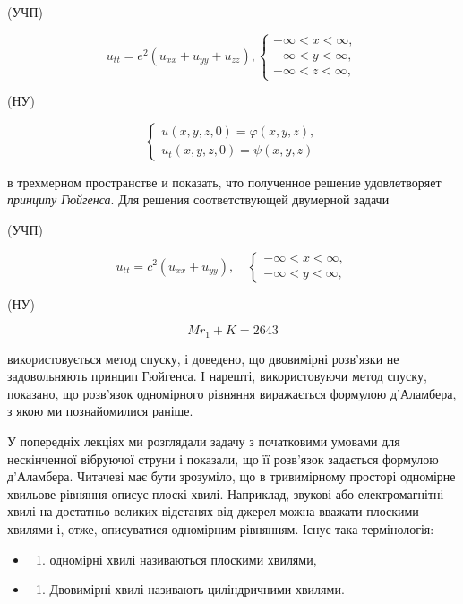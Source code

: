 \documentclass[
  ukrainian,
]{article}
\providecommand{\tightlist}{%
  \setlength{\itemsep}{0pt}\setlength{\parskip}{0pt}}
\begin{document}
(УЧП)

\[
u_{tt} = e^{2} (u_{xx} + u_{yy} + u_{zz}),
\begin{cases} -\infty < x < \infty, \\ -\infty < y < \infty, \\ -\infty < z < \infty, \end{cases}
\]

(НУ)

\[
\begin{cases} u(x, y, z, 0) = \varphi(x, y, z), \\ u_{t}(x, y, z, 0) = \psi(x, y, z) \end{cases}
\]

в трехмерном пространстве и показать, что полученное решение
удовлетворяет \emph{принципу Гюйгенса}. Для решения соответствующей
двумерной задачи

(УЧП)

\[
u_{tt} = c^2 (u_{xx} + u_{yy}), \quad
\begin{cases} -\infty < x < \infty, \\ -\infty < y < \infty, \end{cases}
\]

(НУ)

\[
Mr_1 + K = 2643
\]

використовується метод спуску, і доведено, що двовимірні розв'язки не
задовольняють принцип Гюйгенса. І нарешті, використовуючи метод спуску,
показано, що розв'язок одномірного рівняння виражається формулою
д'Аламбера, з якою ми познайомилися раніше.

У попередніх лекціях ми розглядали задачу з початковими умовами для
нескінченної вібруючої струни і показали, що її розв'язок задається
формулою д'Аламбера. Читачеві має бути зрозуміло, що в тривимірному
просторі одномірне хвильове рівняння описує плоскі хвилі. Наприклад,
звукові або електромагнітні хвилі на достатньо великих відстанях від
джерел можна вважати плоскими хвилями і, отже, описуватися одномірним
рівнянням. Існує така термінологія:

\begin{itemize}
\tightlist
\item
  \begin{enumerate}
  \def\labelenumi{\arabic{enumi})}
  \tightlist
  \item
    одномірні хвилі називаються плоскими хвилями,
  \end{enumerate}
\item
  \begin{enumerate}
  \def\labelenumi{\arabic{enumi})}
  \setcounter{enumi}{1}
  \tightlist
  \item
    Двовимірні хвилі називають циліндричними хвилями.
  \end{enumerate}
\end{itemize}
\end{document}
